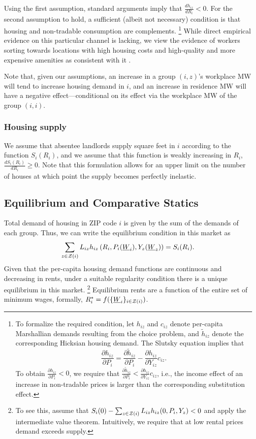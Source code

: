 Using the first assumption, standard arguments imply that 
$\frac{d h_{iz}}{d R_i} < 0$.
For the second assumption to hold, 
a sufficient (albeit not necessary) condition is that housing and non-tradable
consumption are complements.%
\footnote{To formalize the required condition, let $h_{iz}$ and $c_{iz}$ denote 
per-capita Marshallian demands resulting from the choice problem, and 
$\tilde h_{iz}$ denote the corresponding Hicksian housing demand.
The Slutsky equation implies that
$$\frac{\partial h_{iz}}{\partial P_i}
   = \frac{\partial \tilde h_{iz}}{\partial P_i}
   - \frac{\partial h_{iz}}{\partial Y_{iz}} c_{iz}.$$
To obtain $\frac{\partial h_{iz}}{\partial P_i} < 0$, we require that
$\frac{\partial \tilde h_{iz}}{\partial P_i}
< \frac{\partial h_{iz}}{\partial Y_{iz}} c_{iz}$, i.e., the income effect of an
increase in non-tradable prices is larger than the corresponding substitution
effect.}
While direct empirical evidence on this particular channel is lacking,
we view the evidence of workers sorting towards locations with high housing 
costs and high-quality and more expensive amenities as consistent with it 
\parencite[e.g.,][]{CoutureEtAl2019}.

Note that, given our assumptions,
an increase in a group $(i,z)$'s workplace MW will tend to increase housing 
demand in $i$,
and an increase in residence MW will have a negative effect---conditional on 
its effect via the workplace MW of the group $(i,i)$.

\subsubsection*{Housing supply}

We assume that absentee landlords supply square feet in $i$ according to the 
function $S_i(R_i)$,
and we assume that this function is weakly increasing in $R_i$, 
$\frac{d S_i(R_i)}{d R_i} \ge 0$.
Note that this formulation allows for an upper limit on the number of houses at 
which point the supply becomes perfectly inelastic.

\subsection{Equilibrium and Comparative Statics}

Total demand of housing in ZIP code $i$ is given by the sum of the demands of 
each group.
Thus, we can write the equilibrium condition in this market as
\begin{equation}\label{eq:equilibrium}
	\sum_{z\in\mathcal{Z}(i)} L_{iz} h_{iz} \left(R_i, P_i(\underline{W}_i), Y_z(\underline{W}_z)\right) = S_i(R_i) .
\end{equation}
Given that the per-capita housing demand functions are continuous and 
decreasing in rents,
under a suitable regularity condition there is a unique equilibrium in this 
market.%
\footnote{To see this, assume that 
$S_i(0) - \sum_{z\in\mathcal{Z}(i)} L_{iz} h_{iz} (0, P_i, Y_z) < 0$
and apply the intermediate value theorem.
Intuitively, we require that at low rental prices demand exceeds supply.}
Equilibrium rents are a function of the entire set of minimum wages, formally, 
$R^*_i = f(\{\underline{W}_i\}_{i\in\mathcal{Z}(i)})$.

